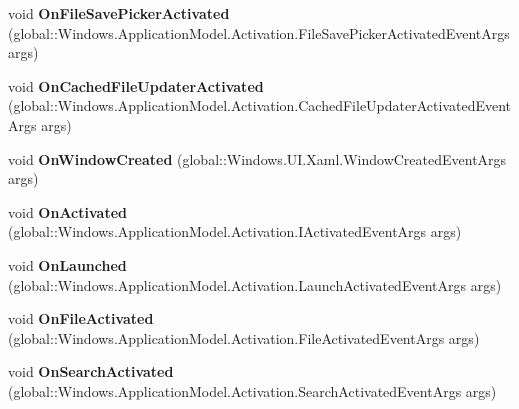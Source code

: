 \begin{DoxyCompactItemize}
void {\bfseries On\+File\+Save\+Picker\+Activated} (global\+::\+Windows.\+Application\+Model.\+Activation.\+File\+Save\+Picker\+Activated\+Event\+Args args)
\item 
\mbox{\label{interface_windows_1_1_u_i_1_1_xaml_1_1_i_application_overrides_ae742ea61ef4a57a981967d42b9269009}} 
void {\bfseries On\+Cached\+File\+Updater\+Activated} (global\+::\+Windows.\+Application\+Model.\+Activation.\+Cached\+File\+Updater\+Activated\+Event\+Args args)
\item 
\mbox{\label{interface_windows_1_1_u_i_1_1_xaml_1_1_i_application_overrides_ae5c60a74b6070b8b620b11c15d8a0d1e}} 
void {\bfseries On\+Window\+Created} (global\+::\+Windows.\+U\+I.\+Xaml.\+Window\+Created\+Event\+Args args)
\item 
\mbox{\label{interface_windows_1_1_u_i_1_1_xaml_1_1_i_application_overrides_a3d67b84df0aa6c2353ba9dfdf0711d43}} 
void {\bfseries On\+Activated} (global\+::\+Windows.\+Application\+Model.\+Activation.\+I\+Activated\+Event\+Args args)
\item 
\mbox{\label{interface_windows_1_1_u_i_1_1_xaml_1_1_i_application_overrides_ab33b8fe098161d6f117c096208d4caa4}} 
void {\bfseries On\+Launched} (global\+::\+Windows.\+Application\+Model.\+Activation.\+Launch\+Activated\+Event\+Args args)
\item 
\mbox{\label{interface_windows_1_1_u_i_1_1_xaml_1_1_i_application_overrides_a9e67cc475338afb3d85b18949e08b15f}} 
void {\bfseries On\+File\+Activated} (global\+::\+Windows.\+Application\+Model.\+Activation.\+File\+Activated\+Event\+Args args)
\item 
\mbox{\label{interface_windows_1_1_u_i_1_1_xaml_1_1_i_application_overrides_aa8ed1fee4ec2b422d17e20f81f1d7c31}} 
void {\bfseries On\+Search\+Activated} (global\+::\+Windows.\+Application\+Model.\+Activation.\+Search\+Activated\+Event\+Args args)
\item 

\end{DoxyCompactItemize}
